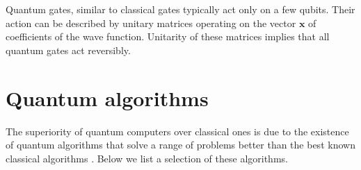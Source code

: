 \documentclass[journal]{IEEEtran}
\begin{document}
Quantum gates, similar to classical gates typically act only on a few qubits. Their action can be described by unitary matrices operating on the vector $\mathbf{x}$ of coefficients of the wave function. Unitarity of these matrices implies that all quantum gates act reversibly.




\section{Quantum algorithms}
\label{sec:box2}
The superiority of quantum computers over classical ones is due to the existence of quantum algorithms that solve a range of problems  better  than the best known classical algorithms \cite{jordan2011quantum}. Below we list a selection of these algorithms.
\end{document}
